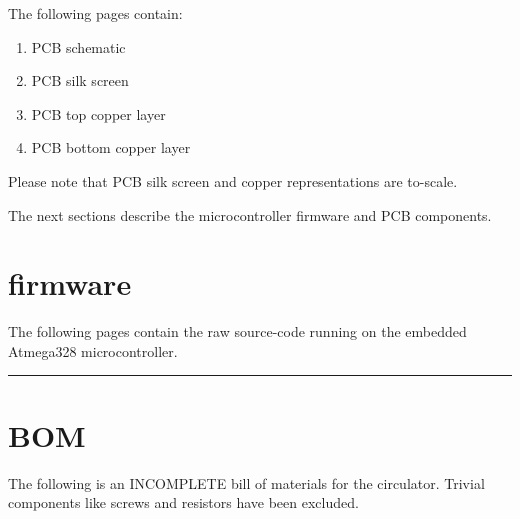 \documentclass{manual}
\begin{document}
The following pages contain:
\begin{enumerate}
  \item PCB schematic
  \item PCB silk screen
  \item PCB top copper layer
  \item PCB bottom copper layer
\end{enumerate}
Please note that PCB silk screen and copper representations are to-scale.

The next sections describe the microcontroller firmware and PCB components.






\section{firmware}

The following pages contain the raw source-code running on the embedded Atmega328 microcontroller.

\vspace{10pt}
\hrule



\section{BOM}

The following is an INCOMPLETE bill of materials for the circulator.
Trivial components like screws and resistors have been excluded.
\end{document}
